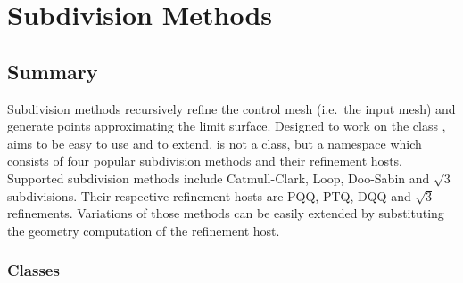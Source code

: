 
\chapter{Subdivision Methods}
\label{chapterSubdivisionRef}


\section*{Summary}

Subdivision methods recursively refine the control mesh 
(i.e.~the input mesh) and generate points approximating 
the limit surface. 
Designed to work on the class ,
 aims to be easy to use and to extend.
 is not a class, but a namespace 
which consists of four popular subdivision methods and their refinement
hosts. Supported subdivision methods include Catmull-Clark, Loop, 
Doo-Sabin and $\sqrt{3}$ subdivisions. Their respective refinement 
hosts are PQQ, PTQ, DQQ and $\sqrt{3}$ refinements.
Variations of those methods can be easily 
extended by substituting the geometry computation of the refinement
host.


\subsection*{Classes}

